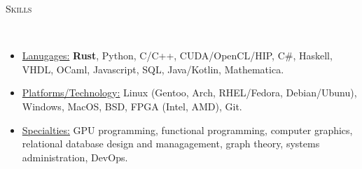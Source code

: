 \documentclass[9pt]{article}
\newenvironment{changemargin}[2]{%
  \begin{list}{}{%
    \setlength{\topsep}{0pt}%
    \setlength{\leftmargin}{#1}%
    \setlength{\rightmargin}{#2}%
    \setlength{\listparindent}{\parindent}%
    \setlength{\itemindent}{\parindent}%
    \setlength{\parsep}{\parskip}%
  }%
  \item[]}{\end{list}
}
\newcommand{\lineover}{
	\begin{changemargin}{-0.05in}{-0.05in}
		\vspace*{-8pt}
		\hrulefill \\
		\vspace*{-2pt}
	\end{changemargin}
}
\newcommand{\header}[1]{
	\begin{changemargin}{-0.5in}{-0.5in}
		\scshape{#1}\\
  	\lineover
	\end{changemargin}
}
\newenvironment{body} {
	\vspace*{-16pt}
	\begin{changemargin}{-0.25in}{-0.5in}
  }	
	{\end{changemargin}
}
\begin{document}
	\smallskip
	\vspace*{-3pt}



\smallskip

\header{Skills}
\smallskip
\begin{body}
	\vspace{14pt}
	\begin{itemize} \itemsep -0pt

		\item \uline{Lanugages:} \textbf{Rust}, Python, C/C++, CUDA/OpenCL/HIP, C\#, Haskell, VHDL, OCaml, Javascript, SQL, Java/Kotlin, Mathematica.

		\item \uline{Platforms/Technology:} Linux (Gentoo, Arch, RHEL/Fedora,
		Debian/Ubunu), Windows, MacOS,
		      BSD, FPGA (Intel, AMD), Git.
		\item \uline{Specialties:} GPU programming, functional programming, computer graphics, relational database design and managagement, graph theory, systems administration, DevOps.
	\end{itemize}
\end{body}
\end{document}
